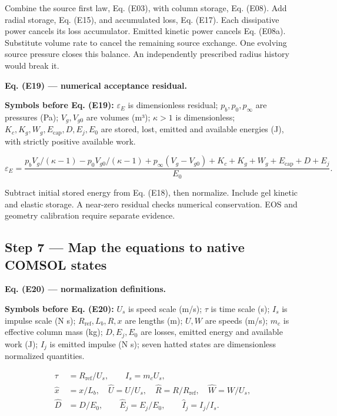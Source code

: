 \documentclass[11pt]{article}
\begin{document}
Combine the source first law, Eq. (E03), with column storage, Eq. (E08). Add radial storage, Eq. (E15), and accumulated loss, Eq. (E17). Each dissipative power cancels its loss accumulator. Emitted kinetic power cancels Eq. (E08a). Substitute volume rate to cancel the remaining source exchange. One evolving source pressure closes this balance. An independently prescribed radius history would break it.


\textbf{Eq. (E19) — numerical acceptance residual.}


\textbf{Symbols before Eq. (E19):} \(\varepsilon_E\) is dimensionless residual; \(p_b,p_0,p_\infty\) are pressures (Pa); \(V_g,V_{g0}\) are volumes (m³); \(\kappa>1\) is dimensionless; \(K_c,K_g,W_g,E_{\mathrm{cap}},D,E_j,E_0\) are stored, lost, emitted and available energies (J), with strictly positive available work.



\begin{equation*}
\varepsilon_E=
\frac{p_bV_g/(\kappa-1)-p_0V_{g0}/(\kappa-1)+p_\infty(V_g-V_{g0})+K_c+K_g+W_g+E_{\mathrm{cap}}+D+E_j}{E_0}.
\end{equation*}

Subtract initial stored energy from Eq. (E18), then normalize. Include gel kinetic and elastic storage. A near-zero residual checks numerical conservation. EOS and geometry calibration require separate evidence.



\subsection*{Step 7 — Map the equations to native COMSOL states}

\textbf{Eq. (E20) — normalization definitions.}


\textbf{Symbols before Eq. (E20):} \(U_s\) is speed scale (m/s); \(\tau\) is time scale (s); \(I_s\) is impulse scale (N s); \(R_{\mathrm{ref}},L_b,R,x\) are lengths (m); \(U,W\) are speeds (m/s); \(m_c\) is effective column mass (kg); \(D,E_j,E_0\) are losses, emitted energy and available work (J); \(I_j\) is emitted impulse (N s); seven hatted states are dimensionless normalized quantities.



\begin{equation*}
\begin{aligned}
\tau&=R_{\mathrm{ref}}/U_s,\qquad I_s=m_cU_s,\\
\widehat x&=x/L_b,\quad\widehat U=U/U_s,\quad\widehat R=R/R_{\mathrm{ref}},\quad\widehat W=W/U_s,\\
\widehat D&=D/E_0,\qquad\widehat E_j=E_j/E_0,\qquad\widehat I_j=I_j/I_s.
\end{aligned}
\end{equation*}
\end{document}
